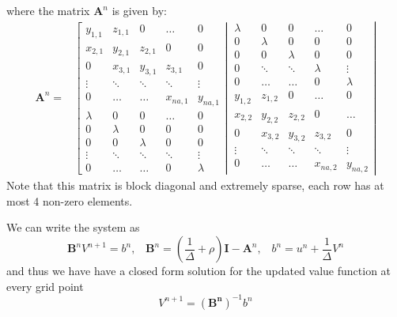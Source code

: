 \documentclass[12pt]{article}
\DeclareMathOperator{\1}{\mathbbm{1}}
\begin{document}
where the matrix $\mathbf{A}^n$ is given by:
\begin{align}\label{eq:sparseA}
	\mathbf{A}^n=&
	\left[\begin{matrix}
	y_{1,1} & z_{1,1} 	& 0 		& \ldots 	& 0 		\\
	x_{2,1} & y_{2,1} 	& z_{2,1} 	& 0 		& 0			\\
	0 		& x_{3,1} 	& y_{3,1} 	& z_{3,1} 	& 0			\\
	\vdots 	& \ddots 	& \ddots 	& \ddots 	& \vdots	\\
	0 		& \ldots 	& \ldots		& x_{na,1} 	& y_{na,1}	\\ \hline %
	\lambda & 0		 	& 0 		& \dots 	& 0 		\\ 
	0		& \lambda 	& 0		 	& 0 		& 0			\\
	0 		& 0		 	& \lambda 	& 0		 	& 0			\\
	\vdots 	& \ddots 	& \ddots  	& \ddots 	& \vdots	\\
	0 		& \ldots 	& \ldots		& 0 		& \lambda
	\end{matrix} \right| \
	\left.\begin{matrix}
	\lambda& 0		 	& 0 		& \ldots 	& 0 		\\
	0		& \lambda 	& 0		 	& 0 		& 0			\\
	0 		& 0		 	& \lambda 	& 0		 	& 0			\\
	0	 	& \ddots 	& \ddots  	& \lambda 	& \vdots	\\
	0 		& \ldots 	& \ldots		& 0 		& \lambda \\ \hline %
	y_{1,2} & z_{1,2} 	& 0 		& \dots 	& 0 		\\
	x_{2,2} & y_{2,2} 	& z_{2,2} 	& 0 		& \ldots		\\
	0 		& x_{3,2} 	& y_{3,2} 	& z_{3,2} 	& 0			\\
	\vdots 	& \ddots 	& \ddots 	& \ddots 	& \vdots	\\
	0 		& \ldots 	& \ldots		& x_{na,2} 	& y_{na,2}
	\end{matrix} \right|
	\end{align}
	Note that this matrix is block diagonal and extremely sparse, each row has at most 4 non-zero elements.
	
We can write the system as
	\begin{equation}
	\mathbf{B}^nV^{n+1} = b^n, \;\;\; \mathbf{B}^n = \left(\frac{1}{\Delta} + \rho \right)\mathbf{I} - \mathbf{A}^n, \;\;\; b^n= u^n + \frac{1}{\Delta}V^n
	\end{equation}
	and thus we have have a closed form solution for the updated value function at every grid point
\begin{equation} V^{n+1}= (\mathbf{B^n})^{-1} b^n
\end{equation}
\end{document}
